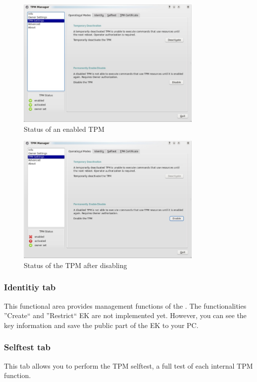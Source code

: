 \documentclass[
  american        %
]{sirrixreport}
\begin{document}
\begin{figure}[h]
 \centering
   \includegraphics[width=0.8\textwidth]{images/man_statenabled}
   \caption{Status of an enabled TPM }
\label{fig:disable}
\end{figure}
\begin{figure}[h]
 \centering
   \includegraphics[width=0.8\textwidth]{images/man_statdisabled}
   \caption{Status of the TPM after disabling}
\label{fig:enable}
\end{figure}
\clearpage

\subsubsection{Identitiy tab} This functional area provides management functions of the \EK. The functionalities ''Create`` and ''Restrict`` EK are not implemented yet. However, you can see the key information and save the public part of the EK to your PC. 
\subsubsection{Selftest tab} This tab allows you to perform the TPM selftest, a full test of each internal TPM function.
\end{document}
